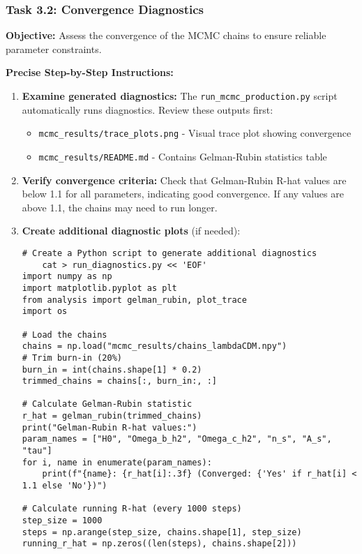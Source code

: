 \documentclass[11pt]{article}
\begin{document}
\subsubsection{Task 3.2: Convergence Diagnostics}

\textbf{Objective:} Assess the convergence of the MCMC chains to ensure reliable parameter constraints.

\textbf{Precise Step-by-Step Instructions:}

\begin{enumerate}
    \item \textbf{Examine generated diagnostics:} The \texttt{run\_mcmc\_production.py} script automatically runs diagnostics. Review these outputs first:
    \begin{itemize}
        \item \texttt{mcmc\_results/trace\_plots.png} - Visual trace plot showing convergence
        \item \texttt{mcmc\_results/README.md} - Contains Gelman-Rubin statistics table
    \end{itemize}
    
    \item \textbf{Verify convergence criteria:} Check that Gelman-Rubin R-hat values are below 1.1 for all parameters, indicating good convergence. If any values are above 1.1, the chains may need to run longer.
    
    \item \textbf{Create additional diagnostic plots} (if needed):
    \begin{lstlisting}[basicstyle=\small\ttfamily]
    # Create a Python script to generate additional diagnostics
    cat > run_diagnostics.py << 'EOF'
import numpy as np
import matplotlib.pyplot as plt
from analysis import gelman_rubin, plot_trace
import os

# Load the chains
chains = np.load("mcmc_results/chains_lambdaCDM.npy")
# Trim burn-in (20%)
burn_in = int(chains.shape[1] * 0.2)
trimmed_chains = chains[:, burn_in:, :]

# Calculate Gelman-Rubin statistic
r_hat = gelman_rubin(trimmed_chains)
print("Gelman-Rubin R-hat values:")
param_names = ["H0", "Omega_b_h2", "Omega_c_h2", "n_s", "A_s", "tau"]
for i, name in enumerate(param_names):
    print(f"{name}: {r_hat[i]:.3f} (Converged: {'Yes' if r_hat[i] < 1.1 else 'No'})")

# Calculate running R-hat (every 1000 steps)
step_size = 1000
steps = np.arange(step_size, chains.shape[1], step_size)
running_r_hat = np.zeros((len(steps), chains.shape[2]))


\end{lstlisting}
\end{enumerate}
\end{document}
